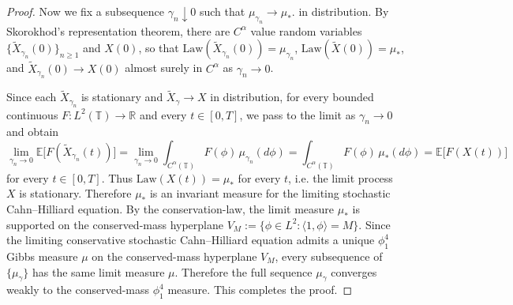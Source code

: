 \documentclass{article}
\begin{document}
\begin{proof}
Now we fix a subsequence \(\gamma_n\downarrow0\) such that
\(
\mu_{\gamma_n}\rightarrow \mu_*.
\) in distribution.
By Skorokhod's representation theorem, there are $C^{\alpha}$ value random variables $\{\widetilde X_{\gamma_n}(0)\}_{n \geq 1}$ and $X(0)$, so that $\mathrm{Law}(\widetilde X_{\gamma_{n}}(0)) = \mu_{\gamma_{n}}$, $\mathrm{Law}(\widetilde X(0)) = \mu_*$, and $\widetilde X_{\gamma_{n}}(0) \to X(0)$ almost surely in $C^{\alpha}$ as $\gamma_{n} \to 0$.

Since each \(\widetilde X_{\gamma_n}\) is stationary and $\widetilde X_{\gamma} \to X$ in distribution, for every bounded continuous \(F: L^2(\mathbb T)\to\mathbb R\) and every \(t\in[0,T]\), we pass to the limit as $\gamma_n \to 0$ and obtain
\[
 \lim_{\gamma_n \to 0}\mathbb E\bigl[F(\widetilde X_{\gamma_n}(t))\bigr] = \lim_{\gamma_n \to 0}\int_{C^{\alpha}(\mathbb T)} F(\phi)\,\mu_{\gamma_n}(d\phi) =
\int_{C^{\alpha}(\mathbb T)} F(\phi)\,\mu_*(d\phi) = \mathbb E\bigl[F(X(t))\bigr]
\]
for every $t\in[0,T]$.
Thus \(\mathrm{Law}(X(t)) = \mu_*\) for every \(t\), i.e. the limit process \(X\) is stationary.
Therefore \(\mu_*\) is an invariant measure for the limiting stochastic Cahn--Hilliard equation.
By the conservation-law, the limit measure \(\mu_*\) is supported on the conserved-mass hyperplane \( V_M := \{ \phi \in L^2: \langle 1,\phi \rangle = M \}\).
Since the limiting conservative stochastic Cahn--Hilliard equation admits a unique $\phi^4_1$ Gibbs measure $\mu$ on the conserved-mass hyperplane \(V_M\), every subsequence of \(\{\mu_\gamma\}\) has the same limit measure \(\mu\). Therefore the full sequence \(\mu_\gamma\) converges weakly to the conserved-mass \(\phi^4_1\) measure.
This completes the proof.
\end{proof}



\end{document}
